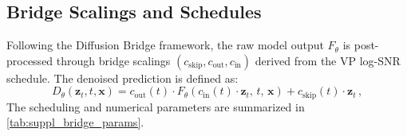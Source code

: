 \begin{table}[h]
\centering
\caption{{\color{gray}Source image conditioning configuration.}}
\label{tab:suppl_conditioning}
{\color{gray}
%
}
\end{table}

\subsection{Bridge Scalings and Schedules}
Following the Diffusion Bridge framework, the raw model output $F_\theta$ is post-processed through bridge scalings $(c_{\text{skip}}, c_{\text{out}}, c_{\text{in}})$ derived from the VP log-SNR schedule. The denoised prediction is defined as:
\begin{equation}
    D_\theta(\bm{z}_t, t, \bm{x}) = c_{\text{out}}(t) \cdot F_\theta(c_{\text{in}}(t) \cdot \bm{z}_t,\, t,\, \bm{x}) + c_{\text{skip}}(t) \cdot \bm{z}_t\,,
    \label{eq:suppl_denoiser}
\end{equation}
The scheduling and numerical parameters are summarized in \cref{tab:suppl_bridge_params}.

\begin{table}[h]
\centering
\caption{{\color{gray}Bridge scheduling and numerical parameters.}}
\label{tab:suppl_bridge_params}
{\color{gray}
%
}
\end{table}

